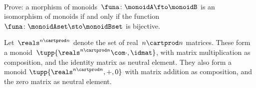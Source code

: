 
\clearpage

~

\vfill%

\begin{gradedexercise}
    Prove: a morphism of monoids~$\funa\colon \monoidA \fto \monoidB$ is an isomorphism of monoids if and only if the function~$\funa\colon \monoidAset \sto \monoidBset$ is bijective.
\end{gradedexercise}

\begin{gradedexercise}
    \label{ex:TraceAndDeterminant}
    Let~$\reals^{n \cartprod n}$ denote the set of real~$n \cartprod n$ matrices.
    These form a monoid~$\tupp{\reals^{n \cartprod n}\com \cdot, \idmat}$, with matrix multiplication as composition, and the identity matrix as neutral element.
    They also form a monoid $\tupp{\reals^{n \cartprod n}, + , 0}$ with matrix addition as composition, and the zero matrix as neutral element.


\end{gradedexercise}
